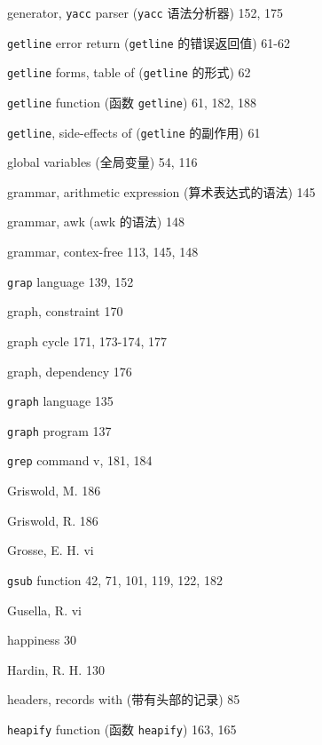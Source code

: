 \begin{multicols}{3}
\hangindent=3pc  generator, \verb'yacc' parser (\verb'yacc'
语法分析器) 152, 175

\hangindent=3pc  \verb'getline' error return (\verb'getline'
的错误返回值) 61-62

\hangindent=3pc  \verb'getline' forms, table of (\verb'getline'
的形式) 62

\hangindent=3pc  \verb'getline' function (函数 \verb'getline')
61, 182, 188

\hangindent=3pc  \verb'getline', side-effects of
(\verb'getline' 的副作用) 61

\hangindent=3pc  global variables (全局变量) 54, 116

\hangindent=3pc  grammar, arithmetic expression
(算术表达式的语法) 145

\hangindent=3pc  grammar, awk (awk 的语法) 148

\hangindent=3pc  grammar, contex-free 113, 145, 148

\hangindent=3pc  \verb'grap' language 139, 152

\hangindent=3pc  graph, constraint 170

\hangindent=3pc  graph cycle 171, 173-174, 177

\hangindent=3pc  graph, dependency 176

\hangindent=3pc  \verb'graph' language 135

\hangindent=3pc  \verb'graph' program 137

\hangindent=3pc  \verb'grep' command v, 181, 184

\hangindent=3pc  Griswold, M. 186

\hangindent=3pc  Griswold, R. 186

\hangindent=3pc  Grosse, E. H. vi

\hangindent=3pc  \verb'gsub' function 42, 71, 101, 119, 122, 182

\hangindent=3pc  Gusella, R. vi

\hangindent=3pc  happiness 30

\hangindent=3pc  Hardin, R. H. 130

\hangindent=3pc  headers, records with (带有头部的记录) 85

\hangindent=3pc  \verb'heapify' function (函数 \verb'heapify') 163, 165


\end{multicols}
